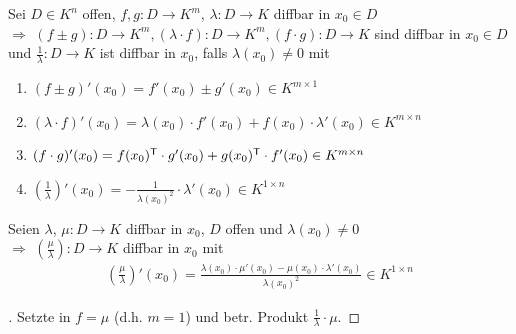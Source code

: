 \begin{proposition}[Rechenregeln]
	Sei $D\in K^n$ offen, $f,g: D\to K^m$, $\lambda: D\to K$  \gls{diffbar} in $x_0\in D$ \\
	$\Rightarrow$ $(f\pm g): D\to K^m, (\lambda\cdot f):D\to K^m, (f\cdot g):D\to K$ sind  \gls{diffbar} in $x_0\in D$ und $\frac{1}{\lambda}:D\to K$ ist  \gls{diffbar} in $x_0$, falls $\lambda(x_0)\neq 0$
	mit
	\begin{enumerate}[label={\alph*)}]
		\item $(f\pm g)'(x_0) = f'(x_0) \pm g'(x_0)\in K^{m\times 1}$
		\item $(\lambda\cdot f)'(x_0) = \lambda (x_0)\cdot f'(x_0) + f(x_0)\cdot \lambda'(x_0)\in K^{m\times n}$
		\item $(f\cdot g)' (x_0) = f(x_0)^\mathsf{T}\cdot g'(x_0) + g(x_0)^\mathsf{T}\cdot f'(x_0)\in K^{m\times n}$
		\item $\left( \frac{1}{\lambda}\right)'(x_0) = - \frac{1}{\lambda(x_0)^2}\cdot \lambda'(x_0)\in K^{1\times n}$
	\end{enumerate}
\end{proposition}

\begin{conclusion}
	Seien $\lambda$, $\mu:D\to K$  \gls{diffbar} in $x_0$, $D$ offen und $\lambda(x_0)\neq 0$ \\
	$\Rightarrow$ $\left( \frac{\mu}{\lambda} \right): D\to K$  \gls{diffbar} in $x_0$ mit \begin{align*}
		\left( \frac{\mu}{\lambda} \right)' (x_0) = \frac{\lambda(x_0)\cdot \mu'(x_0) - \mu(x_0) \cdot \lambda'(x_0)}{\lambda(x_0)^2}\in K^{1\times n}
	\end{align*}
\end{conclusion}

\begin{proof}[]
	Setzte in  $f=\mu$ (d.h. $m=1$) und betr. Produkt $\frac{1}{\lambda}\cdot \mu$.
\end{proof}


